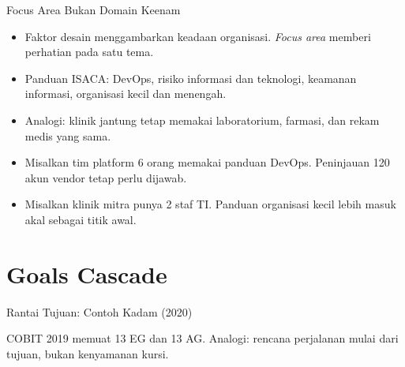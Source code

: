 \documentclass[aspectratio=169, table, 12pt]{beamer}
\begin{document}
\begin{frame}{{\Large Focus Area Bukan Domain Keenam}}
  \vspace{4pt}
  \small
  \begin{itemize}
    \item Faktor desain menggambarkan keadaan organisasi. \textit{Focus area} memberi perhatian pada satu tema.
    \item Panduan ISACA: DevOps, risiko informasi dan teknologi, keamanan informasi, organisasi kecil dan menengah.
    \item Analogi: klinik jantung tetap memakai laboratorium, farmasi, dan rekam medis yang sama.
    \item Misalkan tim platform 6 orang memakai panduan DevOps. Peninjauan 120 akun vendor tetap perlu dijawab.
    \item Misalkan klinik mitra punya 2 staf TI. Panduan organisasi kecil lebih masuk akal sebagai titik awal.
  \end{itemize}
\end{frame}

\section{Goals Cascade}

\begin{frame}{{\Large Rantai Tujuan: Contoh Kadam (2020)}}
  \centering
  \vspace{4pt}
  

  \vspace{6pt}
  \raggedright\small COBIT 2019 memuat 13 EG dan 13 AG. Analogi: rencana perjalanan mulai dari tujuan, bukan kenyamanan kursi.
\end{frame}
\end{document}
